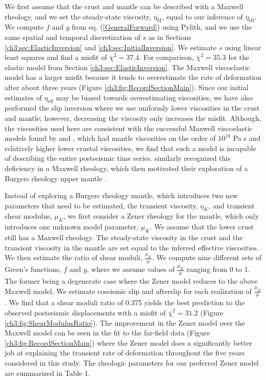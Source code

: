We first assume that the crust and mantle can be described with a
Maxwell rheology, and we set the steady-state viscosity,
$\eta_\mathrm{M}$, equal to our inference of $\eta_{\mathrm{eff}}$.
We compute $f$ and $g$ from eq. (\ref{GeneralForward}) using Pylith,
and we use the same spatial and temporal discretization of $s$ as in
Sections \ref{ch3:sec:ElasticInversion} and
\ref{ch3:sec:InitialInversion}. We estimate $s$ using linear least
squares and find a misfit of $\bar\chi^2=37.4$. For comparison,
$\bar\chi^2=35.3$ for the elastic model from Section
\ref{ch3:sec:ElasticInversion}.  The Maxwell viscoelastic model has a
larger misfit because it tends to overestimate the rate of deformation
after about three years (Figure \ref{ch3:fig:RecordSectionMain}).
Since our initial estimates of $\eta_\mathrm{eff}$ may be biased
towards overestimating viscosities, we have also performed the slip
inversion where we use uniformly lower viscosities in the crust and
mantle; however, decreasing the viscosity only increases the misfit.
Although, the viscosities used here are consistent with the successful
Maxwell viscoelastic models found by \citet{Rollins2015} and
\citet{Spinler2015}, which had mantle viscosities on the order of
$10^{18}$ Pa s and relatively higher lower crustal viscosities, we
find that such a model is incapable of describing the entire
postseismic time series.  \citet{Pollitz2001} similarly recognized
this deficiency in a Maxwell rheology, which then motivated their
exploration of a Burgers rheology upper mantle \citep{Pollitz2003}.

Instead of exploring a Burgers rheology mantle, which introduces two
new parameters that need to be estimated, the transient viscosity,
$\eta_{K}$, and transient shear modulus, $\mu_{K}$, we first consider
a Zener rheology for the mantle, which only introduces one unknown
model parameter, $\mu_{K}$.  We assume that the lower crust still has
a Maxwell rheology. The steady-state viscosity in the crust and the
transient viscosity in the mantle are set equal to the inferred
effective viscosities.  We then estimate the ratio of shear moduli,
$\frac{\mu_K}{\mu}$. We compute nine different sets of Green's
functions, $f$ and $g$, where we assume values of $\frac{\mu_K}{\mu}$
ranging from 0 to 1. The former being a degenerate case where the
Zener model reduces to the above Maxwell model.  We estimate coseismic
slip and afterslip for each realization of $\frac{\mu_K}{\mu}$.  We
find that a shear moduli ratio of 0.375 yields the best prediction to
the observed postseismic displacements with a misfit of
$\bar\chi^2=31.2$ (Figure \ref{ch3:fig:ShearModulusRatio}).  The
improvement in the Zener model over the Maxwell model can be seen in
the fit to the far-field data (Figure \ref{ch3:fig:RecordSectionMain})
where the Zener model does a significantly better job at explaining
the transient rate of deformation throughout the five years considered
in this study.  The rheologic parameters for our preferred Zener model
are summarized in Table 1.

